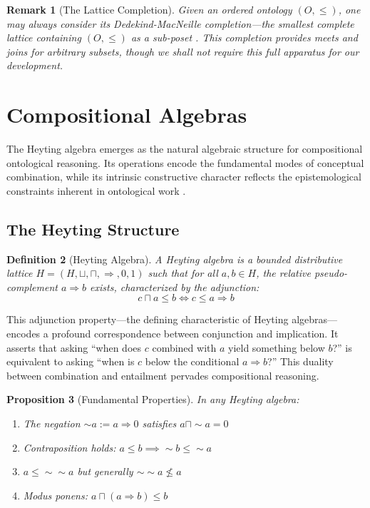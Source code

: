 \documentclass[11pt,a4paper]{article}
\newtheorem{definition}{Definition}[section]
\newtheorem{proposition}[definition]{Proposition}
\newtheorem{remark}[definition]{Remark}
\begin{document}
\begin{remark}[The Lattice Completion]
Given an ordered ontology $(O, \leq)$, one may always consider its Dedekind-MacNeille completion---the smallest complete lattice containing $(O, \leq)$ as a sub-poset \citep{davey2002}. This completion provides meets and joins for arbitrary subsets, though we shall not require this full apparatus for our development.
\end{remark}

\section{Compositional Algebras}

The Heyting algebra emerges as the natural algebraic structure for compositional ontological reasoning. Its operations encode the fundamental modes of conceptual combination, while its intrinsic constructive character reflects the epistemological constraints inherent in ontological work \citep{heyting1956}.

\subsection{The Heyting Structure}

\begin{definition}[Heyting Algebra]
A \emph{Heyting algebra} \citep{heyting1956, johnstone1982} is a bounded distributive lattice $H = (H, \sqcup, \sqcap, \Rightarrow, 0, 1)$ such that for all $a, b \in H$, the \emph{relative pseudo-complement} $a \Rightarrow b$ exists, characterized by the adjunction:
$$
c \sqcap a \leq b \iff c \leq a \Rightarrow b
$$
\end{definition}

This adjunction property---the defining characteristic of Heyting algebras---encodes a profound correspondence between conjunction and implication. It asserts that asking ``when does $c$ combined with $a$ yield something below $b$?'' is equivalent to asking ``when is $c$ below the conditional $a \Rightarrow b$?'' This duality between combination and entailment pervades compositional reasoning.

\begin{proposition}[Fundamental Properties]
In any Heyting algebra:
\begin{enumerate}[label=(\roman*)]
    \item The negation $\sim a := a \Rightarrow 0$ satisfies $a \sqcap \sim a = 0$
    \item Contraposition holds: $a \leq b \implies \sim b \leq \sim a$
    \item $a \leq \sim\sim a$ but generally $\sim\sim a \not\leq a$
    \item Modus ponens: $a \sqcap (a \Rightarrow b) \leq b$
\end{enumerate}
\end{proposition}
\end{document}
